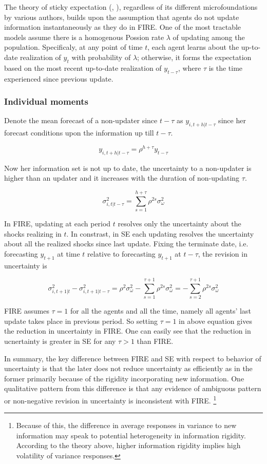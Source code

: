 \documentclass[]{article}
\begin{document}
The theory of sticky expectation (\citet{xx}, \citet{xx} ), regardless of its different microfoundations by various authors, builds upon the assumption that agents do not update information instantaneously as they do in FIRE. One of the most tractable models assume there is a homogenous Possion rate $\lambda$ of updating among the population. Specificaly, at any point of time $t$, each agent learns about the up-to-date realization of $y_t$ with probability of $\lambda$; otherwise, it forms the expectation based on the most recent up-to-date realization of $y_{t-\tau}$, where $\tau$ is the time experienced since previous update. 




\subsubsection{Individual moments} 

Denote the mean forecast of a non-updater since $t-\tau$ as $y_{i,t+h|t-\tau}$ since her forecast conditions upon the information up till $t-\tau$.

$$y_{i,t+h|t-\tau} = \rho^{h+\tau} y_{t-\tau}$$

Now her information set is not up to date, the uncertainty to a non-updater is higher than an updater and it increases with the duration of non-updating $\tau$. 

$$\sigma^2_{i,t|t-\tau}= \sum^{h+\tau}_{s=1}\rho^{2s} \sigma^2_{\omega}$$
 
In FIRE, updating at each period $t$ resolves only the uncertainty about the shocks realizing in $t$. In constrast, in SE each updating resolves the uncertainty about all the realized shocks since last update. Fixing the terminate date, i.e. forecasting  $y_{t+1}$ at time $t$ relative to forecasting $y_{t+1}$ at $t-\tau$, the revision in uncertainty is 

$$\sigma^2_{i,t+1|t} - \sigma^2_{i,t+1|t-\tau} = \rho^{2} \sigma^2_{\omega} - \sum^{\tau+1}_{s=1}\rho^{2s} \sigma^2_{\omega} = -\sum^{\tau+1}_{s=2} \rho^{2s}\sigma^2_{\omega}$$

FIRE assumes  $\tau=1$ for all the agents and all the time, namely all agents' last update takes place in previous period. So setting $\tau =1$ in above equation gives the reduction in uncertainty in FIRE. One can easily see that the reduction in ucnertainty is greater in SE for any $\tau>1$ than FIRE.

In summary, the key difference between FIRE and SE with respect to behavior of uncertainty is that the later does not reduce uncertainty  as efficiently as in the former primarily because of the rigidity incorporating new information.  One qualitative pattern from this difference is that any evidence of ambiguous pattern  or non-negative revision in uncertainty is inconsistent with FIRE. \footnote{Because of this, the difference in average responses in variance to new information may speak to potential heterogeneity in information rigidity. According to the theory above, higher information rigidity implies high volatility of variance responses.  }
 
\end{document}
